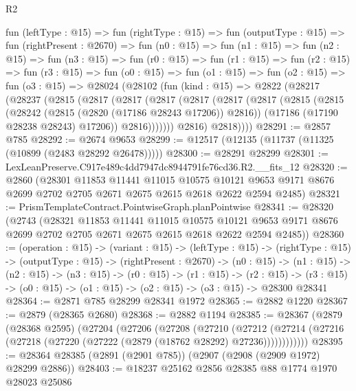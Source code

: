 \begin{lexlean}{R2}
\begin{coremodule}
  fun (leftType : @15) =>
  fun (rightType : @15) =>
  fun (outputType : @15) =>
  fun (rightPresent : @2670) =>
  fun (n0 : @15) =>
  fun (n1 : @15) =>
  fun (n2 : @15) =>
  fun (n3 : @15) =>
  fun (r0 : @15) =>
  fun (r1 : @15) =>
  fun (r2 : @15) =>
  fun (r3 : @15) =>
  fun (o0 : @15) =>
  fun (o1 : @15) =>
  fun (o2 : @15) =>
  fun (o3 : @15) =>
  @28024
    (@28102
      (fun (kind : @15) =>
      @2822
        (@28217
          (@28237
            (@2815
              (@2817
                (@2817
                  (@2817
                    (@2817
                      (@2817
                        (@2817
                          (@2815
                            (@2815
                              (@28242 (@2815 (@2820 (@17186 @28243 @17206)) @2816))
                              (@17186 (@17190 @28238 @28243) @17206))
                            @2816)))))))
              @2816)
            @2818))))
@28291 := @2857 @785
@28292 := @2674 @9653
@28299 := @12517 (@12135 (@11737 (@11325 (@10899 (@2483 @28292 @26478)))))
@28300 := @28291 @28299
@28301 := LexLeanPreserve.C917e489c4dd7947dc8944791fe76cd36.R2.__fits_12
@28320 := @2860
    (@28301
      @11853
      @11441
      @11015
      @10575
      @10121
      @9653
      @9171
      @8676
      @2699
      @2702
      @2705
      @2671
      @2675
      @2615
      @2618
      @2622
      @2594
      @2485)
@28321 := PrismTemplateContract.PointwiseGraph.planPointwise
@28341 := @28320
    (@2743
      (@28321
        @11853
        @11441
        @11015
        @10575
        @10121
        @9653
        @9171
        @8676
        @2699
        @2702
        @2705
        @2671
        @2675
        @2615
        @2618
        @2622
        @2594
        @2485))
@28360 := (operation : @15) ->
  (variant : @15) ->
  (leftType : @15) ->
  (rightType : @15) ->
  (outputType : @15) ->
  (rightPresent : @2670) ->
  (n0 : @15) ->
  (n1 : @15) ->
  (n2 : @15) ->
  (n3 : @15) ->
  (r0 : @15) ->
  (r1 : @15) ->
  (r2 : @15) -> (r3 : @15) -> (o0 : @15) -> (o1 : @15) -> (o2 : @15) -> (o3 : @15) -> @28300 @28341
@28364 := @2871 @785 @28299 @28341 @1972
@28365 := @2882 @1220
@28367 := @2879 (@28365 @2680)
@28368 := @2882 @1194
@28385 := @28367
    (@2879
      (@28368 @2595)
      (@27204
        (@27206
          (@27208
            (@27210
              (@27212
                (@27214 (@27216 (@27218 (@27220 (@27222 (@2879 (@18762 @28292) @27236))))))))))))
@28395 := @28364 @28385 (@2891 (@2901 @785)) (@2907 (@2908 (@2909 @1972) @28299 @2886))
@28403 := @18237 @25162 @2856 @28385 @88 @1774 @1970 @28023 @25086

\end{coremodule}
\end{lexlean}
